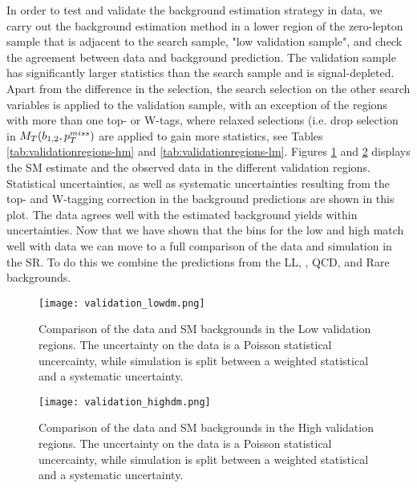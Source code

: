 In order to test and validate the background estimation strategy in data, we carry out the background estimation method in a lower \met{} region of the zero-lepton sample that is adjacent to the search sample, "low \met{} validation sample", and check the agreement between data and background prediction. The validation sample has significantly larger statistics than the search sample and is signal-depleted. Apart from the difference in the \met{} selection, the search selection on the other search variables is applied to the validation sample, with an exception of the regions with more than one top- or W-tags, where relaxed selections (i.e. drop selection in $M_T(b_{1,2},p_{T}^{miss})$ are applied to gain more statistics, see Tables \ref{tab:validationregions-hm} and \ref{tab:validationregions-lm}. Figures \ref{fig:validation-region-lm} and \ref{fig:validation-region-hm} displays the SM estimate and the observed data in the different validation regions. Statistical uncertainties, as well as systematic uncertainties resulting from the top- and W-tagging correction in the background predictions are shown in this plot. The data agrees well with the estimated background yields within uncertainties. Now that we have shown that the bins for the low and high \dm{} match well with data we can move to a full comparison of the data and simulation in the SR. To do this we combine the predictions from the LL, \Znunu, QCD, and Rare backgrounds.

\begin{figure}
	\begin{center}
  \texttt{[image: validation\_lowdm.png]}
	\end{center}
	\caption[LM Validation Region]{Comparison of the data and SM backgrounds in the Low \dm{} validation regions. The uncertainty on the data is a Poisson statistical uncercainty, while simulation is split between a weighted statistical and a systematic uncertainty.
	 }
	\label{fig:validation-region-lm}
\end{figure}

\begin{figure}
	\begin{center}
  \texttt{[image: validation\_highdm.png]}
	\end{center}
	\caption[Lost Lepton HM Control Region]{Comparison of the data and SM backgrounds in the High \dm{} validation regions. The uncertainty on the data is a Poisson statistical uncercainty, while simulation is split between a weighted statistical and a systematic uncertainty.
	 }
	\label{fig:validation-region-hm}
\end{figure}

